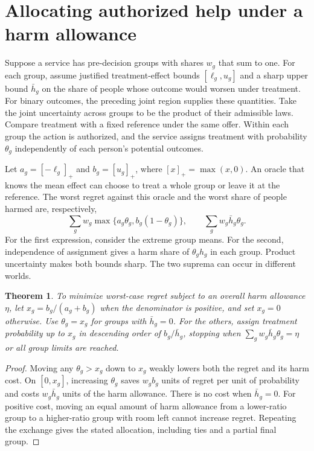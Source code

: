 \documentclass[11pt]{article}
\newtheorem{theorem}{Theorem}
\begin{document}
\section{Allocating authorized help under a harm allowance}
Suppose a service has pre-decision groups with shares $w_g$ that
sum to one. For each group, assume justified treatment-effect bounds
$[\ell_g,u_g]$ and a sharp upper bound $\bar h_g$ on the share of
people whose outcome would worsen under treatment. For binary
outcomes, the preceding joint region supplies these quantities.
Take the joint uncertainty across groups to be the product of
their admissible laws. Compare treatment with a fixed reference
under the same offer. Within each group the action is authorized,
and the service assigns treatment with probability $\theta_g$
independently of each person's potential outcomes.

Let $a_g=[-\ell_g]_+$ and $b_g=[u_g]_+$, where $[x]_+=\max(x,0)$.
An oracle that knows the mean effect can choose to treat a whole
group or leave it at the reference. The worst regret against this
oracle and the worst share of people harmed are, respectively,
\[
 \sum_g w_g\max\{a_g\theta_g,b_g(1-\theta_g)\},
 \qquad \sum_g w_g\bar h_g\theta_g.
\]
For the first expression, consider the extreme group means.
For the second, independence of assignment gives a harm share
of $\theta_g h_g$ in each group. Product uncertainty makes both
bounds sharp. The two suprema can occur in different worlds.

\begin{theorem}
To minimize worst-case regret subject to an overall harm allowance
$\eta$, let $x_g=b_g/(a_g+b_g)$ when the denominator is positive,
and set $x_g=0$ otherwise. Use $\theta_g=x_g$ for groups with
$\bar h_g=0$. For the others, assign treatment probability up to
$x_g$ in descending order of $b_g/\bar h_g$, stopping when
$\sum_g w_g\bar h_g\theta_g=\eta$ or all group limits are reached.
\end{theorem}
\begin{proof}
Moving any $\theta_g>x_g$ down to $x_g$ weakly lowers both the
regret and its harm cost. On $[0,x_g]$, increasing $\theta_g$
saves $w_g b_g$ units of regret per unit of probability and costs
$w_g\bar h_g$ units of the harm allowance. There is no cost when
$\bar h_g=0$. For positive cost, moving an equal amount of harm
allowance from a lower-ratio group to a higher-ratio group with
room left cannot increase regret. Repeating the exchange gives
the stated allocation, including ties and a partial final group.
\end{proof}
\end{document}
